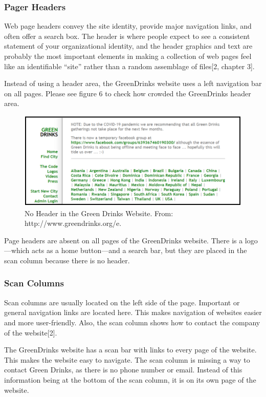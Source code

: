 \documentclass[12pt]{article}
\begin{document}
\subsubsection*{Pager Headers}
Web page headers convey the site identity, provide major navigation links, and often offer a search box. The header is where people expect to see a consistent statement of your organizational identity, and the header graphics and text are probably the most important elements in making a collection of web pages feel like an identifiable “site” rather than a random assemblage of files[2, chapter 3].

Instead of using a header area, the GreenDrinks website uses a left navigation bar on all pages. Please see figure 6 to check how crowded the GreenDrinks header area.
\begin{figure}[ht]
\centering
\includegraphics[width=1.0\textwidth]{f6}
\caption[No Header in the Green Drinks Website.]{No Header in the Green Drinks Website.  From: http://www.greendrinks.org/e\footnotemark.}
\end{figure}
 
Page headers are absent on all pages of the GreenDrinks website. There is a logo—which acts as a home button—and a search bar, but they are placed in the scan column because there is no header.
\subsubsection*{Scan Columns}	
Scan columns are usually located on the left side of the page. Important or general navigation links are located here. This makes navigation of websites easier and more user-friendly. Also, the scan column shows how to contact the company of the website[2].

The GreenDrinks website has a scan bar with links to every page of the website. This makes the website easy to navigate. The scan column is missing a way to contact Green Drinks, as there is no phone number or email. Instead of this information being at the bottom of the scan column, it is on its own page of the website.
\end{document}
